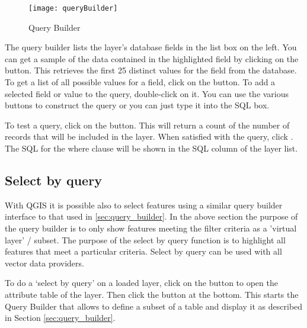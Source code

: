 \begin{figure}[ht]
  \begin{center}
    \caption{Query Builder \nixcaption}\label{fig:query_builder}\smallskip
    \texttt{[image: queryBuilder]}
  \end{center}  
\end{figure}

The query builder lists the layer's database
fields in the list box on the left. You can get a sample of the data
contained in the highlighted field by clicking on the  button. This retrieves the first 25 distinct values
for the field from the database. To get a list of all possible values for a
field, click on the  button. To add a selected field or value to the query, double-click on
it. You can use the various buttons to
construct the query or you can just type it into the SQL box.

To test a query, click on the  button. This will return a count of the number of records that will be
included in the layer. When satisfied with the query, click . The
SQL for the where clause will be shown in the SQL column of the layer list.

\begin{Tip}\caption{\textsc{Changing the Layer Definition}}
\end{Tip}

\subsection{Select by query}\label{sec:select_by_query}

With QGIS it is possible also to select features using a similar query builder 
interface to that used in \ref{sec:query_builder}. In the above section 
the purpose of the query builder is to only show features meeting the 
filter criteria as a 'virtual layer' / subset. The purpose of the select by 
query function is to highlight all features that meet a particular criteria. 
Select by query can be used with all vector data providers.

To do a `select by query' on a loaded layer, click on the 
button  to open the attribute table of the layer. Then 
click the  button at the bottom. This starts the Query Builder 
that allows to define a subset of a table and display it as described in Section 
\ref{sec:query_builder}.


